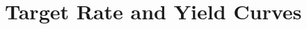 \documentclass[11pt,a4paper,english,oneside]{book}
\numberwithin{equation}{chapter}
\begin{document}
\newpage

{} 





\newpage

\appendix
\noappendicestocpagenum
\addappheadtotoc



\renewcommand{\theequation}{A.\arabic{equation}}


\chapter{Target Rate and Yield Curves}\label{AppendixA}
\vspace{-0.5cm}
\end{document}
